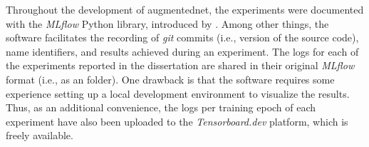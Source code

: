 
Throughout the development of \gls{augmentednet}, the
experiments were documented with the \emph{MLflow} Python
library, introduced by \textcite{zaharia2018accelerating}.
Among other things, the software facilitates the recording
of \emph{git} commits
(i.e., version of the source code), name identifiers, and
results achieved during an experiment. The logs for each of
the experiments reported in the dissertation are shared in
their original \emph{MLflow} format (i.e., as an
 folder). One drawback is that the software
requires some experience setting up a local development
environment to visualize the results. Thus, as an additional
convenience, the logs per training epoch of each experiment
have also been uploaded to the
\emph{Tensorboard.dev}
platform, which is
freely available.
